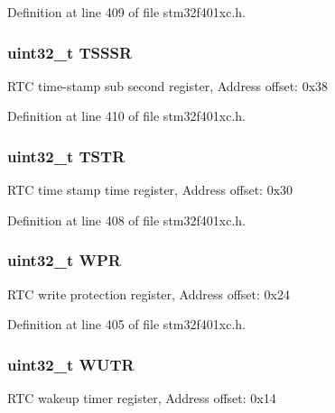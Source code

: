 Definition at line 409 of file stm32f401xc.\+h.

\subsubsection[{\texorpdfstring{T\+S\+S\+SR}{TSSSR}}]{ uint32\+\_\+t T\+S\+S\+SR}\hypertarget{struct_r_t_c___type_def_a1d6c2bc4c067d6a64ef30d16a5925796}{}\label{struct_r_t_c___type_def_a1d6c2bc4c067d6a64ef30d16a5925796}
R\+TC time-\/stamp sub second register, Address offset\+: 0x38 

Definition at line 410 of file stm32f401xc.\+h.

\subsubsection[{\texorpdfstring{T\+S\+TR}{TSTR}}]{ uint32\+\_\+t T\+S\+TR}\hypertarget{struct_r_t_c___type_def_a042059c8b4168681d6aecf30211dd7b8}{}\label{struct_r_t_c___type_def_a042059c8b4168681d6aecf30211dd7b8}
R\+TC time stamp time register, Address offset\+: 0x30 

Definition at line 408 of file stm32f401xc.\+h.

\subsubsection[{\texorpdfstring{W\+PR}{WPR}}]{ uint32\+\_\+t W\+PR}\hypertarget{struct_r_t_c___type_def_a6204786b050eb135fabb15784698e86e}{}\label{struct_r_t_c___type_def_a6204786b050eb135fabb15784698e86e}
R\+TC write protection register, Address offset\+: 0x24 

Definition at line 405 of file stm32f401xc.\+h.

\subsubsection[{\texorpdfstring{W\+U\+TR}{WUTR}}]{ uint32\+\_\+t W\+U\+TR}\hypertarget{struct_r_t_c___type_def_ac5b3c8be61045a304d3076d4714d29f2}{}\label{struct_r_t_c___type_def_ac5b3c8be61045a304d3076d4714d29f2}
R\+TC wakeup timer register, Address offset\+: 0x14 

